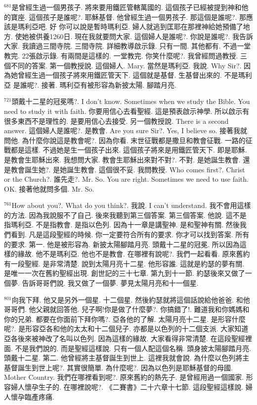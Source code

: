 \documentclass{book}
\begin{document}
$^{681}$是曾經生過一個男孩子.
將來要用鐵匠管轄萬國的.
這個孩子已經被提到神和他的寶座.
這個孩子是誰呢?.
耶穌基督.
他曾經生過一個男孩子.
那這個是誰呢?.
那應該是瑪利亞吧.
好 你可以說是暫時瑪利亞.
婦人就逃到匡耶在那裡神給她預備了地方.
使她被供養1260日.
現在我就要問大家.
這個婦人是誰呢?.
你說是誰呢?.
我告訴大家.
我讀過三間寺院.
三間寺院.
詳細教導啟示錄.
只有一間.
其他都有.
不過一堂教完.
22張啟示錄.
有兩間是這樣的.
一堂教完.
你笑什麼呢?.
我曾經問過教授.
三個不同的答案.
第一個教授說.
這個婦人.
Mary.
當然是瑪利亞.
我說.
Why Sir?.
因為她曾經生過一個孩子將來用鐵匠管天下.
這個就是基督.
生基督出來的.
不是瑪利亞 是誰呢?.
接著.
瑪利亞有被形容為新披太陽.
腳踏月亮.

$^{721}$頭戴十二星的冠冕嗎?.
I don't know.
Sometimes when we study the Bible.
You need to study it with faith.
你要用信心去看聖經.
這是預表啟示神學.
所以啟示有很多東西不是理性的.
是要用信心去接受.
另一個教授說.
There is a second answer.
這個婦人是誰呢?.
是教會.
Are you sure Sir?.
Yes, I believe so.
接著我就問他.
為什麼你說這是教會呢?.
因為你看.
末世征戰都是撒旦和教會征戰.
一路的征戰都是這樣.
不過她是生一個孩子出來.
這個孩子將來是用鐵匠管天下.
即是耶穌.
是教會生耶穌出來.
我想問大家.
教會生耶穌出來對不對?.
不對.
是她誕生教會.
還是教會誕生她?.
是她誕生教會.
這個很不妥.
我問教授.
Who comes first?.
Christ or the Church?.
誰先走?.
Mr. So.
You are right.
Sometimes we need to use faith.
OK.
接著他就問多個.
Mr. So.

$^{761}$How about you?.
What do you think?.
我說.
I can't understand.
我不會用這樣的方法.
因為我說服不了自己.
後來我聽到第三個答案.
第三個答案.
他說.
這不是指瑪利亞.
不是指教會.
是指以色列.
因為十一章是講聖神.
是和聖神有關.
然後我們看到.
凡是這段聖經的時候.
你一定要符合所有的要求.
你才可以找到答案.
所有的要求.
第一.
他是被形容為.
新披太陽腳踏月亮.
頭戴十二星的冠冕.
所以因為這樣的緣故.
他不是瑪利亞.
他也不是教會.
在哪裡有說呢?.
我們一起看看.
原來舊約有一段聖經.
是非常清楚.
說到太陽月亮十二星.
他形容誰.
這就是約瑟的夢有關.
是唯一一次在舊約聖經出現.
創世記的三十七章.
第九到十一節.
約瑟後來又做了一個夢.
告訴哥哥們說.
我又做了一個夢.
夢見太陽月亮和十一個星.

$^{801}$向我下拜.
他又是另外一個星.
十二個星.
然後約瑟就將這個話說給他爸爸.
和他哥哥們.
他父親就回答他.
兒子啊!你是做了什麼夢?.
你搞錯了!.
難道我和你媽媽和你的兄弟.
都要在你面前下拜你嗎?.
亞各他的了解.
太陽月亮十二星.
是形容什麼呢?.
是形容亞各和他的太太和十二個兒子.
亦都是以色列的十二個支派.
大家知道亞各後來被神改了名叫以色列.
因為這樣的緣故.
大家看得非常清楚.
在這段聖經裡面.
不是我們說的.
而是聖經這樣說.
只有一個人配這個名稱.
頭身披太陽腳踏月亮.
頭戴十二星.
第二.
他曾經將主基督誕生到世上.
這裡我就會說.
為什麼以色列將主基督誕生到世上呢?.
其實很簡單.
為什麼呢?.
因為以色列是耶穌基督的母國.
Mother Country.
我們在哪裡看到呢?.
原來舊約的熱先子.
是曾經用過一個國家.
形容婦人懷孕生子的.
在哪裡說呢?.
《二賽書》二十六章十七節.
這段聖經這樣說.
婦人懷孕臨產疼痛.
\end{document}

